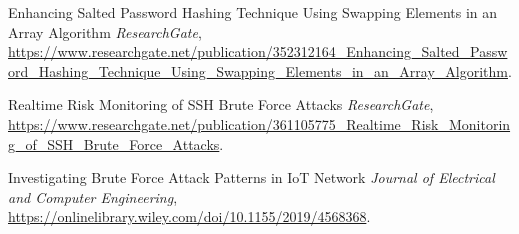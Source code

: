 \documentclass{comjnl}
\begin{document}
\begin{thebibliography}{99}
   Enhancing Salted Password Hashing Technique Using Swapping Elements in an Array Algorithm
  \textit{ResearchGate}, \url{https://www.researchgate.net/publication/352312164_Enhancing_Salted_Password_Hashing_Technique_Using_Swapping_Elements_in_an_Array_Algorithm}.
  
   Realtime Risk Monitoring of SSH Brute Force Attacks
  \textit{ResearchGate}, \url{https://www.researchgate.net/publication/361105775_Realtime_Risk_Monitoring_of_SSH_Brute_Force_Attacks}.

   Investigating Brute Force Attack Patterns in IoT Network
  \textit{Journal of Electrical and Computer Engineering}, \url{https://onlinelibrary.wiley.com/doi/10.1155/2019/4568368}.
  

\end{thebibliography}




\end{document}
